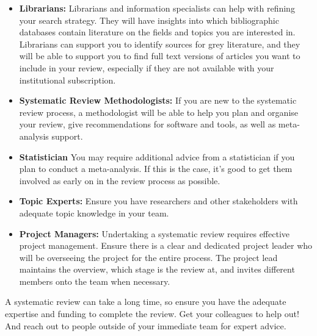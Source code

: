 \documentclass[
]{book}
\begin{document}
\begin{itemize}
\item
  \textbf{Librarians:} Librarians and information specialists can help with refining your search strategy. They will have insights into which bibliographic databases contain literature on the fields and topics you are interested in. Librarians can support you to identify sources for grey literature, and they will be able to support you to find full text versions of articles you want to include in your review, especially if they are not available with your institutional subscription.
\item
  \textbf{Systematic Review Methodologists:} If you are new to the systematic review process, a methodologist will be able to help you plan and organise your review, give recommendations for software and tools, as well as meta-analysis support.
\item
  \textbf{Statistician} You may require additional advice from a statistician if you plan to conduct a meta-analysis. If this is the case, it's good to get them involved as early on in the review process as possible.
\item
  \textbf{Topic Experts:} Ensure you have researchers and other stakeholders with adequate topic knowledge in your team.
\item
  \textbf{Project Managers:} Undertaking a systematic review requires effective project management. Ensure there is a clear and dedicated project leader who will be overseeing the project for the entire process. The project lead maintains the overview, which stage is the review at, and invites different members onto the team when necessary.
\end{itemize}

A systematic review can take a long time, so ensure you have the adequate expertise and funding to complete the review. Get your colleagues to help out! And reach out to people outside of your immediate team for expert advice.
\end{document}
